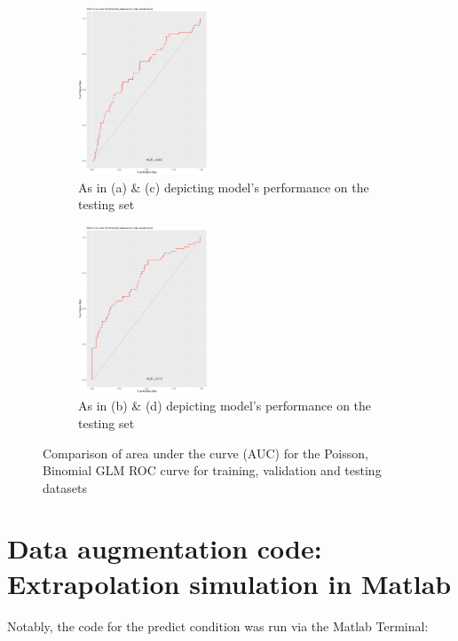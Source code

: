 \documentclass{DissertateUSU}
\begin{document}
\begin{figure}[t!]
\medskip
\begin{subfigure}{0.48\textwidth}
\includegraphics[width=\linewidth, height=5cm]{POI_ROC_Testing.pdf}
\caption{As in (a) \& (c) depicting model's performance on the testing set} \label{POI_ROC_Test}
\end{subfigure}\hspace*{\fill}
\begin{subfigure}{0.48\textwidth}
\includegraphics[width=\linewidth, height=5cm]{BIN_ROC_Testing.pdf}
\caption{As in (b) \& (d) depicting model's performance on the testing set} \label{BIN_ROC_Test}
\end{subfigure}

\caption{Comparison of area under the curve (AUC) for the Poisson, Binomial GLM ROC curve for training, validation and testing datasets} \label{ROCCurveAll}
\end{figure}

\clearpage

\section{Data augmentation code: Extrapolation simulation in Matlab}
\label{sec:Data augmentation code: Extrapolation simulation in Matlab}

Notably, the code for the predict condition was run via the Matlab
Terminal:

\small
\end{document}
